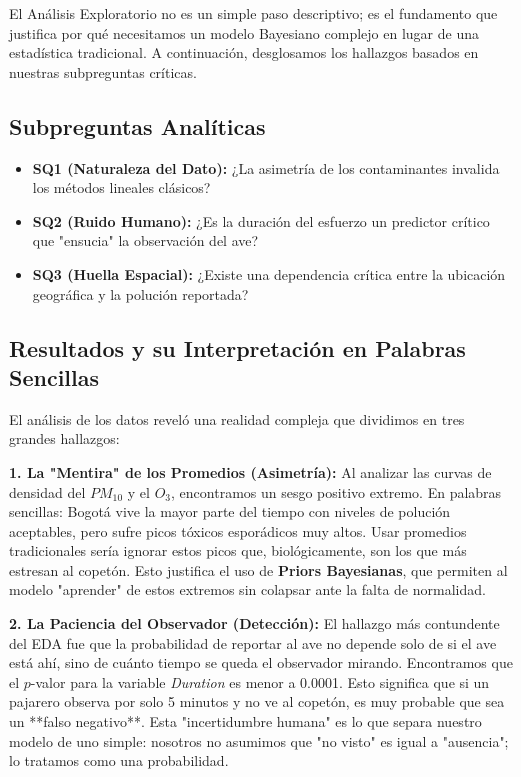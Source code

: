 \documentclass[12pt]{article}
\begin{document}
El Análisis Exploratorio no es un simple paso descriptivo; es el fundamento que justifica por qué necesitamos un modelo Bayesiano complejo en lugar de una estadística tradicional. A continuación, desglosamos los hallazgos basados en nuestras subpreguntas críticas.

\subsection*{Subpreguntas Analíticas}
\begin{itemize}
    \item \textbf{SQ1 (Naturaleza del Dato):} ¿La asimetría de los contaminantes invalida los métodos lineales clásicos?
    \item \textbf{SQ2 (Ruido Humano):} ¿Es la duración del esfuerzo un predictor crítico que "ensucia" la observación del ave?
    \item \textbf{SQ3 (Huella Espacial):} ¿Existe una dependencia crítica entre la ubicación geográfica y la polución reportada?
\end{itemize}

\subsection*{Resultados y su Interpretación en Palabras Sencillas}

El análisis de los datos reveló una realidad compleja que dividimos en tres grandes hallazgos:

\textbf{1. La "Mentira" de los Promedios (Asimetría):}
Al analizar las curvas de densidad del $PM_{10}$ y el $O_3$, encontramos un sesgo positivo extremo. En palabras sencillas: Bogotá vive la mayor parte del tiempo con niveles de polución aceptables, pero sufre picos tóxicos esporádicos muy altos. Usar promedios tradicionales sería ignorar estos picos que, biológicamente, son los que más estresan al copetón. Esto justifica el uso de \textbf{Priors Bayesianas}, que permiten al modelo "aprender" de estos extremos sin colapsar ante la falta de normalidad.

\textbf{2. La Paciencia del Observador (Detección):}
El hallazgo más contundente del EDA fue que la probabilidad de reportar al ave no depende solo de si el ave está ahí, sino de cuánto tiempo se queda el observador mirando. Encontramos que el $p$-valor para la variable \textit{Duration} es menor a 0.0001. Esto significa que si un pajarero observa por solo 5 minutos y no ve al copetón, es muy probable que sea un **falso negativo**. Esta "incertidumbre humana" es lo que separa nuestro modelo de uno simple: nosotros no asumimos que "no visto" es igual a "ausencia"; lo tratamos como una probabilidad.
\end{document}

